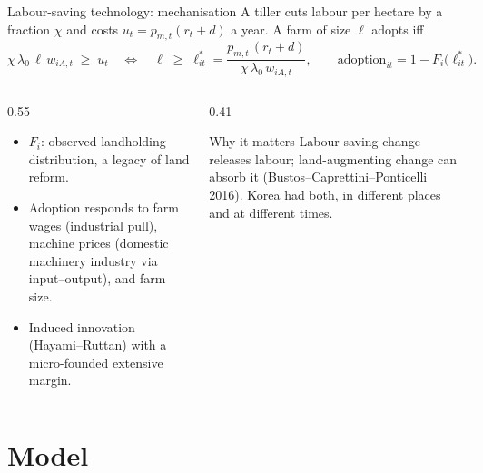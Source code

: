 \documentclass[10pt,aspectratio=169]{beamer}
\newcommand{\hl}[1]{\textcolor{mOrange}{#1}}
\begin{document}
\begin{frame}{Labour-saving technology: mechanisation}
  A tiller cuts labour per hectare by a fraction $\chi$ and costs $u_t=p_{m,t}(r_t+d)$ a
  year. A farm of size $\ell$ adopts iff
  \begin{equation*}
    \chi\,\lambda_0\,\ell\,w_{iA,t}\;\ge\;u_t
    \quad\Longleftrightarrow\quad
    \ell\;\ge\;\ell^{*}_{it}=\frac{p_{m,t}\,(r_t+d)}{\chi\,\lambda_0\,w_{iA,t}},
    \qquad
    \text{adoption}_{it}=1-F_i\bigl(\ell^{*}_{it}\bigr).
  \end{equation*}
  \begin{columns}[T]
    \begin{column}{0.55\textwidth}
      \small
      \begin{itemize}
        \item $F_i$: observed landholding distribution, a legacy of land reform.
        \item Adoption responds to farm wages (\hl{industrial pull}), machine prices
              (\hl{domestic machinery industry} via input--output), and farm size.
        \item Induced innovation (Hayami--Ruttan) with a micro-founded extensive margin.
      \end{itemize}
    \end{column}
    \begin{column}{0.41\textwidth}
      \begin{block}{Why it matters}
        \small
        Labour-saving change \hl{releases} labour; land-augmenting change can
        \hl{absorb} it (Bustos--Caprettini--Ponticelli 2016). Korea had both, in different
        places and at different times.
      \end{block}
    \end{column}
  \end{columns}
\end{frame}

\section{Model}
\end{document}
